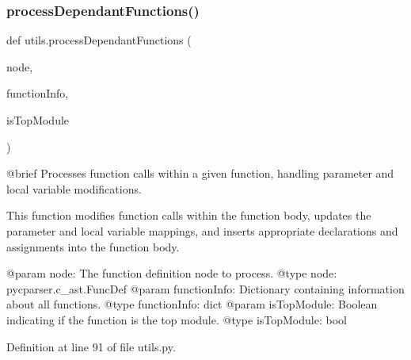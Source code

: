 \subsubsection{\texorpdfstring{process\+Dependant\+Functions()}{processDependantFunctions()}}
{\footnotesize\ttfamily def utils.\+process\+Dependant\+Functions (\begin{DoxyParamCaption}\item[{}]{node,  }\item[{}]{function\+Info,  }\item[{}]{is\+Top\+Module }\end{DoxyParamCaption})}

\begin{DoxyVerb}@brief Processes function calls within a given function, handling parameter and local variable modifications.

This function modifies function calls within the function body, updates the parameter and local variable mappings,
and inserts appropriate declarations and assignments into the function body.

@param node: The function definition node to process.
@type node: pycparser.c_ast.FuncDef
@param functionInfo: Dictionary containing information about all functions.
@type functionInfo: dict
@param isTopModule: Boolean indicating if the function is the top module.
@type isTopModule: bool
\end{DoxyVerb}
 

Definition at line 91 of file utils.\+py.


